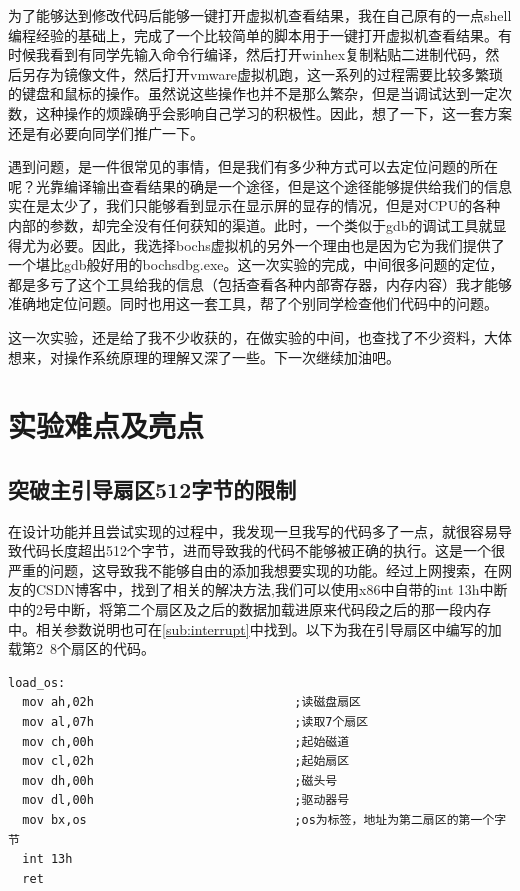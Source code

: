\documentclass[forprint]{WHUBachelor}
\begin{document}
为了能够达到修改代码后能够一键打开虚拟机查看结果，我在自己原有的一点shell编程经验的基础上，完成了一个比较简单的脚本用于一键打开虚拟机查看结果。有时候我看到有同学先输入命令行编译，然后打开winhex复制粘贴二进制代码，然后另存为镜像文件，然后打开vmware虚拟机跑，这一系列的过程需要比较多繁琐的键盘和鼠标的操作。虽然说这些操作也并不是那么繁杂，但是当调试达到一定次数，这种操作的烦躁确乎会影响自己学习的积极性。因此，想了一下，这一套方案还是有必要向同学们推广一下。

遇到问题，是一件很常见的事情，但是我们有多少种方式可以去定位问题的所在呢？光靠编译输出查看结果的确是一个途径，但是这个途径能够提供给我们的信息实在是太少了，我们只能够看到显示在显示屏的显存的情况，但是对CPU的各种内部的参数，却完全没有任何获知的渠道。此时，一个类似于gdb的调试工具就显得尤为必要。因此，我选择bochs虚拟机的另外一个理由也是因为它为我们提供了一个堪比gdb般好用的bochsdbg.exe。这一次实验的完成，中间很多问题的定位，都是多亏了这个工具给我的信息（包括查看各种内部寄存器，内存内容）我才能够准确地定位问题。同时也用这一套工具，帮了个别同学检查他们代码中的问题。

这一次实验，还是给了我不少收获的，在做实验的中间，也查找了不少资料，大体想来，对操作系统原理的理解又深了一些。下一次继续加油吧。

\chapter{实验难点及亮点}

\section{突破主引导扇区512字节的限制}

在设计功能并且尝试实现的过程中，我发现一旦我写的代码多了一点，就很容易导致代码长度超出512个字节，进而导致我的代码不能够被正确的执行。这是一个很严重的问题，这导致我不能够自由的添加我想要实现的功能。经过上网搜索，在网友的CSDN博客\cite{noauthor_boot_nodate}中，找到了相关的解决方法,我们可以使用x86中自带的int 13h中断\cite{wiki:int13}中的2号中断，将第二个扇区及之后的数据加载进原来代码段之后的那一段内存中。相关参数说明也可在\autoref{sub:interrupt}中找到。以下为我在引导扇区中编写的加载第2~8个扇区的代码。

\begin{lstlisting}[language={[x86masm]Assembler}] 
load_os:
  mov ah,02h                            ;读磁盘扇区
  mov al,07h                            ;读取7个扇区
  mov ch,00h                            ;起始磁道
  mov cl,02h                            ;起始扇区
  mov dh,00h                            ;磁头号
  mov dl,00h                            ;驱动器号
  mov bx,os                             ;os为标签，地址为第二扇区的第一个字节
  int 13h
  ret
\end{lstlisting}
\end{document}
